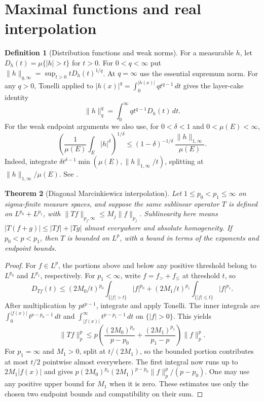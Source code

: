 \documentclass[11pt,oneside,openany]{book}
\newtheorem{theorem}{Theorem}[chapter]
\theoremstyle{definition}
\newtheorem{definition}[theorem]{Definition}
\theoremstyle{remark}
\begin{document}
\section{Maximal functions and real interpolation}

\begin{definition}[Distribution functions and weak norms]
\label{p102:U2-01}
For a measurable \(h\), let \(D_h(t)=\mu\{|h|>t\}\) for \(t>0\).
For \(0<q<\infty\) put \(\|h\|_{q,\infty}=\sup_{t>0}tD_h(t)^{1/q}\).
At \(q=\infty\) use the essential supremum norm. For any \(q>0\), Tonelli applied to \(|h(x)|^q=\int_0^{|h(x)|}qt^{q-1}\,dt\) gives the layer-cake identity
\[
 \|h\|_q^q=\int_0^\infty qt^{q-1}D_h(t)\,dt.
\]
For the weak endpoint arguments we also use, for \(0<\delta<1\) and \(0<\mu(E)<\infty\),
\[
 \left(\frac1{\mu(E)}\int_E|h|^\delta\right)^{1/\delta}
 \le (1-\delta)^{-1/\delta}\,\frac{\|h\|_{1,\infty}}{\mu(E)}.
\]
Indeed, integrate \(\delta t^{\delta-1}\min(\mu(E),\|h\|_{1,\infty}/t)\), splitting at \(\|h\|_{1,\infty}/\mu(E)\). See \cite[\S\S1.3.1 and 1.4.1--1.4.2]{grafakos}.
\end{definition}

\begin{theorem}[Diagonal Marcinkiewicz interpolation]
\label{p102:AN-06-C04-R02}
Let \(1\le p_0<p_1\le\infty\) on sigma-finite measure spaces, and suppose the same sublinear operator \(T\) is defined on \(L^{p_0}+L^{p_1}\), with
\(\|Tf\|_{p_j,\infty}\le M_j\|f\|_{p_j}\). Sublinearity here means \(|T(f+g)|\le |Tf|+|Tg|\) almost everywhere and absolute homogeneity. If \(p_0<p<p_1\), then \(T\) is bounded on \(L^p\), with a bound in terms of the exponents and endpoint bounds.
\end{theorem}
\begin{proof}
For \(f\in L^p\), the portions above and below any positive threshold belong to \(L^{p_0}\) and \(L^{p_1}\), respectively. For \(p_1<\infty\), write \(f=f_>+f_\le\) at threshold \(t\), so
\[
 D_{Tf}(t)\le (2M_0/t)^{p_0}\!\int_{\{|f|>t\}}\!|f|^{p_0}
           +(2M_1/t)^{p_1}\!\int_{\{|f|\le t\}}\!|f|^{p_1}.
\]
After multiplication by \(pt^{p-1}\), integrate and apply Tonelli. The inner integrals are \(\int_0^{|f(x)|}t^{p-p_0-1}\,dt\) and \(\int_{|f(x)|}^\infty t^{p-p_1-1}\,dt\) on \(\{|f|>0\}\). This yields
\[
 \|Tf\|_p^p\le p\left(\frac{(2M_0)^{p_0}}{p-p_0}
                    +\frac{(2M_1)^{p_1}}{p_1-p}\right)\|f\|_p^p.
\]
For \(p_1=\infty\) and \(M_1>0\), split at \(t/(2M_1)\), so the bounded portion contributes at most \(t/2\) pointwise almost everywhere. The first integral now runs up to \(2M_1|f(x)|\) and gives \(p(2M_0)^{p_0}(2M_1)^{p-p_0}\|f\|_p^p/(p-p_0)\). One may use any positive upper bound for \(M_1\) when it is zero. These estimates use only the chosen two endpoint bounds and compatibility on their sum.
\end{proof}
\end{document}
